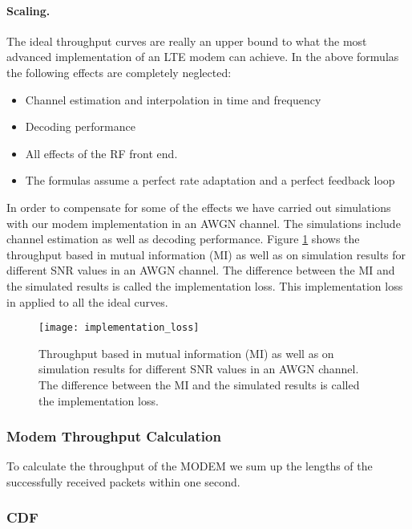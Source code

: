 \documentclass[a4paper,10pt]{article}
\newcommand{\printfile}[2][]{
 \begin{minipage}{8cm}
  \centering
  \texttt{[image: /extras/kaltenbe/CNES/emos\_postprocessed\_data/\#2]}
  \url{#2}: #1

 \end{minipage}
}
\begin{document}
\paragraph{Scaling.}
The ideal throughput curves are really an upper bound to what the most advanced implementation of an LTE modem can achieve. In the above formulas the following effects are completely neglected:
\begin{itemize}
 \item Channel estimation and interpolation in time and frequency
 \item Decoding performance
 \item All effects of the RF front end.
 \item The formulas assume a perfect rate adaptation and a perfect feedback loop
\end{itemize}

In order to compensate for some of the effects we have carried out simulations with our modem implementation in an AWGN channel. The simulations include channel estimation as well as decoding performance.  Figure \ref{fig:imp_loss} shows the throughput based in mutual information (MI) as well as on simulation results for different SNR values in an AWGN channel. The difference between the MI and the simulated results is called the implementation loss. This implementation loss in applied to all the ideal curves.

\begin{figure}
 \centering
 \texttt{[image: implementation\_loss]}
 \caption{Throughput based in mutual information (MI) as well as on simulation results for different SNR values in an AWGN channel. The difference between the MI and the simulated results is called the implementation loss.}
 \label{fig:imp_loss}
\end{figure} 

\subsubsection{Modem Throughput Calculation}
To calculate the throughput of the MODEM we sum up the lengths of the successfully received packets within one second. 


\subsubsection{CDF}
\label{sec:cdf}

\end{document}
